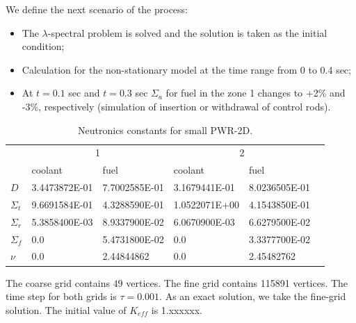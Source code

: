 \documentclass[authoryear]{elsarticle}
\begin{document}
We define the next scenario of the process:
\begin{itemize}
\item The $\lambda$-spectral problem is solved and the solution is taken as the initial condition;
\item Calculation for the non-stationary model at the time range from 0 to 0.4 sec;
\item At $t=0.1$ sec and $t=0.3$ sec $\Sigma_a$ for fuel in the zone 1 changes to +2\% and -3\%, respectively (simulation of insertion or withdrawal of control rods).
\end{itemize}

\begin{table}[ht]
\caption{Neutronics constants for small PWR-2D.}
\label{t1}
\begin{center}
\begin{tabular}{l l l l l l}
\hline
\multirow{2}{*}{} & \multicolumn{2}{c}{1} & \multicolumn{2}{c}{2} \\
\cline{2-5}
& coolant & fuel & coolant & fuel \\
\hline
	$D$          & 3.4473872E-01 & 7.7002585E-01 & 3.1679441E-01 & 8.0236505E-01    \\
	$\Sigma_t$   & 9.6691584E-01 & 4.3288590E-01 & 1.0522071E+00 & 4.1543850E-01    \\
	$\Sigma_r$   & 5.3858400E-03 & 8.9337900E-02 & 6.0670900E-03 & 6.6279500E-02 \\
	$\Sigma_{f}$ & 0.0           & 5.4731800E-02 & 0.0           & 3.3377700E-02 \\
	$\nu$        & 0.0           & 2.44844862    & 0.0           & 2.45482762    \\
\hline
\end{tabular}
\end{center}
\end{table}

The coarse grid contains $49$ vertices.
The fine grid contains 115891 vertices. 
The time step for both grids is $\tau = 0.001$.
As an exact solution, we take the fine-grid solution.
The initial value of $K_{eff}$ is 1.xxxxxx. 
\end{document}
